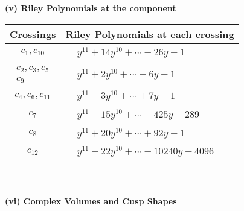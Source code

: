 \documentclass[1p]{elsarticle_modified}
\theoremstyle{definition}
\begin{document}
\newpage\renewcommand{\arraystretch}{1}
\flushleft \textbf{(v) Riley Polynomials at the component}\newline \\
\begin{tabular}{m{50pt}|m{274pt}}
Crossings & \hspace{64pt}Riley Polynomials at each crossing \\
\hline $$\begin{aligned}c_{1},c_{10}\end{aligned}$$&$\begin{aligned}
&y^{11}+14 y^{10}+\cdots-26 y-1
\end{aligned}$\\
\hline $$\begin{aligned}c_{2},c_{3},c_{5}\\c_{9}\end{aligned}$$&$\begin{aligned}
&y^{11}+2 y^{10}+\cdots-6 y-1
\end{aligned}$\\
\hline $$\begin{aligned}c_{4},c_{6},c_{11}\end{aligned}$$&$\begin{aligned}
&y^{11}-3 y^{10}+\cdots+7 y-1
\end{aligned}$\\
\hline $$\begin{aligned}c_{7}\end{aligned}$$&$\begin{aligned}
&y^{11}-15 y^{10}+\cdots-425 y-289
\end{aligned}$\\
\hline $$\begin{aligned}c_{8}\end{aligned}$$&$\begin{aligned}
&y^{11}+20 y^{10}+\cdots+92 y-1
\end{aligned}$\\
\hline $$\begin{aligned}c_{12}\end{aligned}$$&$\begin{aligned}
&y^{11}-22 y^{10}+\cdots-10240 y-4096
\end{aligned}$\\
\hline
\end{tabular}\\~\\
\newpage\flushleft \textbf{(vi) Complex Volumes and Cusp Shapes}
\end{document}
